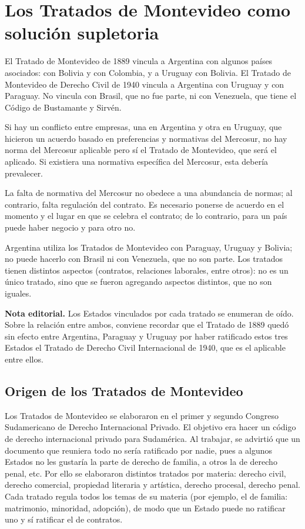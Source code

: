 \documentclass[12pt,oneside]{book}
\begin{document}
\section{Los Tratados de Montevideo como solución supletoria}

El Tratado de Montevideo de 1889 vincula a Argentina con algunos países asociados: con Bolivia y con Colombia, y a Uruguay con Bolivia. El Tratado de Montevideo de Derecho Civil de 1940 vincula a Argentina con Uruguay y con Paraguay. No vincula con Brasil, que no fue parte, ni con Venezuela, que tiene el Código de Bustamante y Sirvén.


Si hay un conflicto entre empresas, una en Argentina y otra en Uruguay, que hicieron un acuerdo basado en preferencias y normativas del Mercosur, no hay norma del Mercosur aplicable pero sí el Tratado de Montevideo, que será el aplicado. Si existiera una normativa específica del Mercosur, esta debería prevalecer.

La falta de normativa del Mercosur no obedece a una abundancia de normas; al contrario, falta regulación del contrato. Es necesario ponerse de acuerdo en el momento y el lugar en que se celebra el contrato; de lo contrario, para un país puede haber negocio y para otro no.

Argentina utiliza los Tratados de Montevideo con Paraguay, Uruguay y Bolivia; no puede hacerlo con Brasil ni con Venezuela, que no son parte. Los tratados tienen distintos aspectos (contratos, relaciones laborales, entre otros): no es un único tratado, sino que se fueron agregando aspectos distintos, que no son iguales.

\begin{note}
\textbf{Nota editorial.} Los Estados vinculados por cada tratado se enumeran de oído. Sobre la relación entre ambos, conviene recordar que el Tratado de 1889 quedó sin efecto entre Argentina, Paraguay y Uruguay por haber ratificado estos tres Estados el Tratado de Derecho Civil Internacional de 1940, que es el aplicable entre ellos.
\end{note}

\subsection{Origen de los Tratados de Montevideo}

Los Tratados de Montevideo se elaboraron en el primer y segundo Congreso Sudamericano de Derecho Internacional Privado. El objetivo era hacer un código de derecho internacional privado para Sudamérica. Al trabajar, se advirtió que un documento que reuniera todo no sería ratificado por nadie, pues a algunos Estados no les gustaría la parte de derecho de familia, a otros la de derecho penal, etc. Por ello se elaboraron distintos tratados por materia: derecho civil, derecho comercial, propiedad literaria y artística, derecho procesal, derecho penal. Cada tratado regula todos los temas de su materia (por ejemplo, el de familia: matrimonio, minoridad, adopción), de modo que un Estado puede no ratificar uno y sí ratificar el de contratos.
\end{document}
